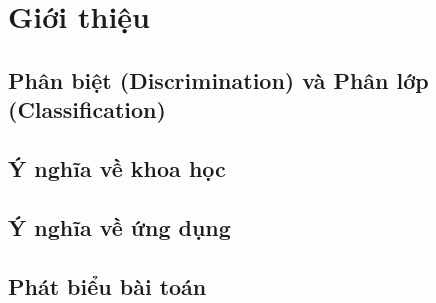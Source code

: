 \documentclass[
  a4paper,
]{article}
\begin{document}
\pagebreak
\tableofcontents 
\pagebreak

\section{Giới thiệu}\label{giux1edbi-thiux1ec7u}

\subsection{Phân biệt (Discrimination) và Phân lớp
(Classification)}\label{phuxe2n-biux1ec7t-discrimination-vuxe0-phuxe2n-lux1edbp-classification}

\subsection{Ý nghĩa về khoa
học}\label{uxfd-nghux129a-vux1ec1-khoa-hux1ecdc}

\subsection{Ý nghĩa về ứng
dụng}\label{uxfd-nghux129a-vux1ec1-ux1ee9ng-dux1ee5ng}

\subsection{Phát biểu bài toán}\label{phuxe1t-biux1ec3u-buxe0i-touxe1n}
\end{document}
